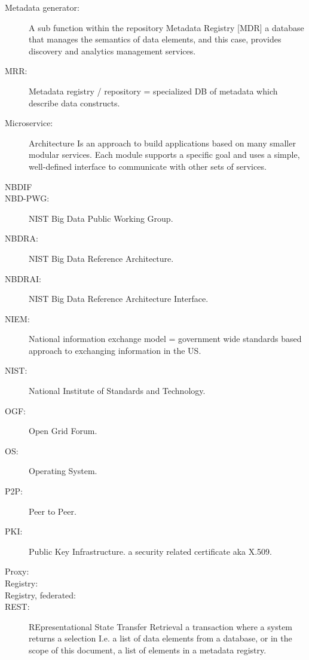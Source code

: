 \begin{description}
\item[Metadata generator:] A sub function within the repository
  Metadata Registry [MDR] a database that manages the semantics of
  data elements, and this case, provides discovery and analytics
  management services.

\item[MRR:] Metadata registry / repository = specialized DB of
  metadata which describe data constructs.

\item[Microservice:] Architecture Is an approach to build applications
  based on many smaller modular services. Each module supports a
  specific goal and uses a simple, well-defined interface to
  communicate with other sets of services.

\item[NBDIF] 
  
\item[NBD-PWG:] NIST Big Data Public Working Group.

\item[NBDRA:] NIST Big Data Reference Architecture.

\item[NBDRAI:] NIST Big Data Reference Architecture Interface.

\item[NIEM:] National information exchange model = government wide
  standards based approach to exchanging information in the US.

\item[NIST:] National Institute of Standards and Technology.

\item[OGF:] Open Grid Forum.

\item[OS:] Operating System.

\item[P2P:] Peer to Peer.

\item[PKI:] Public Key Infrastructure. a security related certificate
  aka X.509.

\item[Proxy:] 

\item[Registry:] 
  
\item[Registry, federated:] 


\item[REST:] REpresentational State Transfer Retrieval a transaction
  where a system returns a selection I.e. a list of data elements from
  a database, or in the scope of this document, a list of elements in
  a metadata registry.


\end{description}
